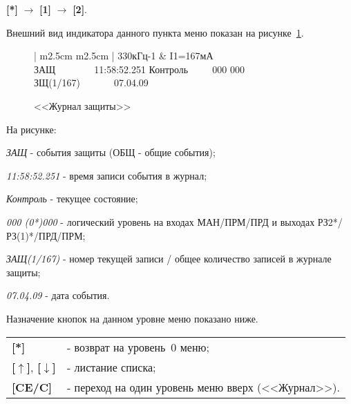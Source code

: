 \textbf{[*]} $\rightarrow$ \textbf{[1]} $\rightarrow$ \textbf{[2]}.

Внешний вид индикатора данного пункта меню показан на рисунке~\ref{fig:journal_def}.
 
 \begin{figure}[H]
 	\centering
		
	\begin{tabular}{| m{2.5cm}  m{2.5cm} |}
		\firsthline
		330кГц-1	& \raggedleft I1=167мА				\tabularnewline 
		 {ЗАЩ~~~~~~~~11:58:52.251} 	\tabularnewline
		 {Контроль~~~~~000 000} 	\tabularnewline 
		 {ЗЩ(1/167)~~~~~~~07.04.09}	\tabularnewline 
		\lasthline
	\end{tabular} 
	
	\caption{<<Журнал защиты>>}
	\label{fig:journal_def}
\end{figure}

\begin{ESKDexplanation}[1.5cm]
	\item[На рисунке:]
	\item {\it ЗАЩ} - события защиты (ОБЩ - общие события);
	\item {\it 11:58:52.251} - время записи события в журнал;
	\item {\it Контроль} - текущее состояние;
	\item {\it 000 (0*)000} - логический уровень на входах МАН/ПРМ/ПРД  и выходах РЗ2*/РЗ(1)*/ПРД/ПРМ;
	\item {\it ЗАЩ(1/167)} - номер текущей записи / общее количество записей в журнале защиты;
	\item {\it 07.04.09} - дата события.
\end{ESKDexplanation}

Назначение кнопок на данном уровне меню показано ниже.
\begin{center}
	\begin{tabular}{p{2cm} p{15cm}}
		\textbf{[*]} 	& - возврат на уровень~0 меню; \tabularnewline
		\textbf{[$\uparrow$]}, \textbf{[$\downarrow$]}  & - листание списка; \tabularnewline
		\textbf{[CE/C]} & - переход на один уровень меню вверх (<<Журнал>>). \tabularnewline				
	\end{tabular}
\end{center} 